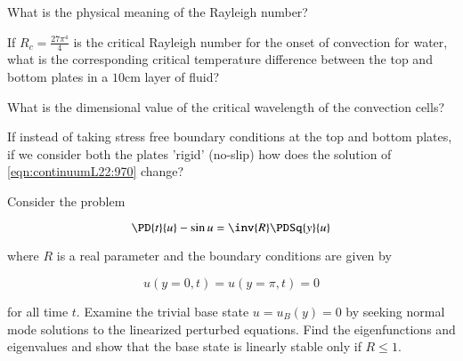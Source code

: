 \begin{Exercise}
What is the physical meaning of the Rayleigh number?
\end{Exercise}
\begin{Exercise}
If $R_c = \frac{27 \pi^4}{4}$ is the critical Rayleigh number for the onset of convection for water, what is the corresponding critical temperature difference between the top and bottom plates in a $10 \text{cm}$ layer of fluid?
\end{Exercise}
\begin{Exercise}
What is the dimensional value of the critical wavelength of the convection cells?
\end{Exercise}
\begin{Exercise}
If instead of taking stress free boundary conditions at the top and bottom plates, if we consider both the plates 'rigid' (no-slip) how does the solution of \ref{eqn:continuumL22:970} change?
\end{Exercise}
\begin{Exercise}
Consider the problem

\begin{equation}\label{eqn:problemSet4:10}
\PD{t}{u} - \sin u = \inv{R} \PDSq{y}{u}
\end{equation}

where $R$ is a real parameter and the boundary conditions are given by

\begin{equation}\label{eqn:problemSet4:20}
u(y = 0, t) = u(y = \pi, t) = 0
\end{equation}

for all time $t$. Examine the trivial base state $u = u_B(y) = 0$ by seeking normal mode solutions to the linearized perturbed equations. Find the eigenfunctions and eigenvalues and show that the base state is linearly stable only if $R \le 1$.
\end{Exercise}

